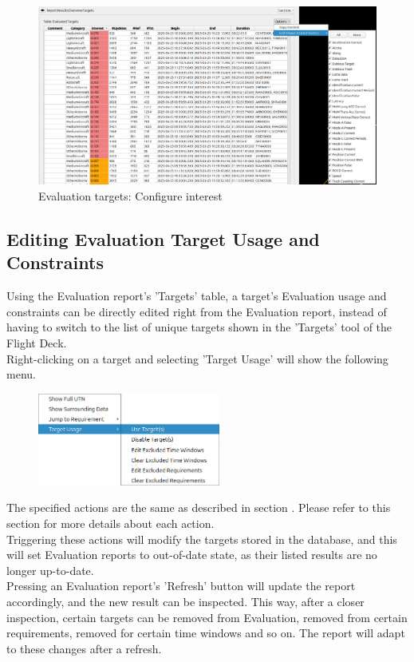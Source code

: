 \begin{figure}[H]
  \hspace*{-2.5cm}
    \includegraphics[width=19cm,frame]{figures/eval_targets_config_interest.png}
  \caption{Evaluation targets: Configure interest}
\end{figure}

\subsection{Editing Evaluation Target Usage and Constraints}
\label{sec:eval_targets_of_interest_usage}

Using the Evaluation report's 'Targets' table, a target's Evaluation usage and constraints 
can be directly edited right from the Evaluation report, instead of having to switch to the 
list of unique targets shown in the 'Targets' tool of the Flight Deck. \\

Right-clicking on a target and selecting 'Target Usage' will show the following menu.

\begin{figure}[H]
  \hspace*{-2cm}
  \center
    \includegraphics[width=6cm,frame]{figures/eval_target_usage.png}
\end{figure}

The specified actions are the same as described in section .
Please refer to this section for more details about each action. \\

Triggering these actions will modify the targets stored in the database,
and this will set Evaluation reports to out-of-date state, as their listed results are no longer up-to-date. \\

Pressing an Evaluation report's 'Refresh' button will update the report accordingly,
and the new result can be inspected. This way, after a closer inspection, certain targets can be removed from Evaluation, 
removed from certain requirements, removed for certain time windows and so on.
The report will adapt to these changes after a refresh.

